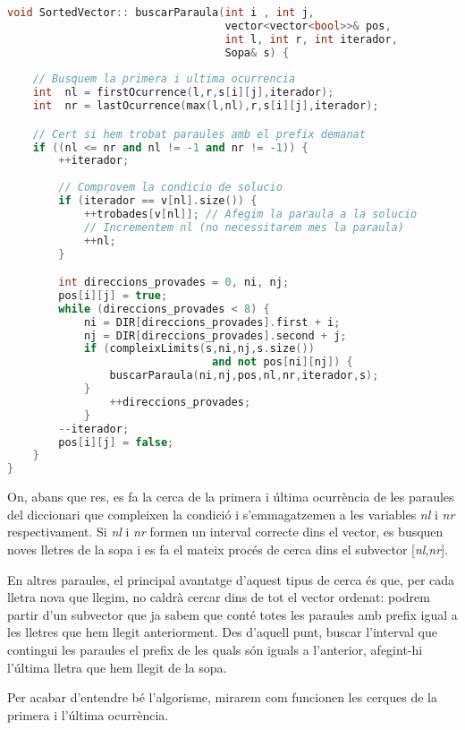 \documentclass[titlepage]{article}
\begin{document}
\begin{lstlisting}[language=C++]
void SortedVector:: buscarParaula(int i , int j, 
                                  vector<vector<bool>>& pos,
                                  int l, int r, int iterador,
                                  Sopa& s) {
    
    // Busquem la primera i ultima ocurrencia
    int  nl = firstOcurrence(l,r,s[i][j],iterador);
    int  nr = lastOcurrence(max(l,nl),r,s[i][j],iterador);

    // Cert si hem trobat paraules amb el prefix demanat
    if ((nl <= nr and nl != -1 and nr != -1)) {
        ++iterador;
        
        // Comprovem la condicio de solucio
        if (iterador == v[nl].size()) { 
            ++trobades[v[nl]]; // Afegim la paraula a la solucio
            // Incrementem nl (no necessitarem mes la paraula)
            ++nl; 
        }

        int direccions_provades = 0, ni, nj;
        pos[i][j] = true;
        while (direccions_provades < 8) {
            ni = DIR[direccions_provades].first + i;
            nj = DIR[direccions_provades].second + j; 
            if (compleixLimits(s,ni,nj,s.size()) 
                                and not pos[ni][nj]) {
                buscarParaula(ni,nj,pos,nl,nr,iterador,s);
            }
                ++direccions_provades;
            }
        --iterador;
        pos[i][j] = false;
    }
}    
\end{lstlisting}


On, abans que res, es fa la cerca de la primera i última ocurrència de les paraules del diccionari que compleixen la condició i s'emmagatzemen a les variables \textit{nl} i \textit{nr} respectivament. Si \textit{nl} i \textit{nr} formen un interval correcte dins el vector, es busquen noves lletres de la sopa i es fa el mateix procés de cerca dins el subvector [\textit{nl},\textit{nr}].\newline\par 
En altres paraules, el principal avantatge d'aquest tipus de cerca és que, per cada lletra nova que llegim, no caldrà cercar dins de tot el vector ordenat: podrem partir d'un subvector que ja sabem que conté totes les paraules amb prefix igual a les lletres que hem llegit anteriorment. Des d'aquell punt, buscar l'interval que contingui les paraules el prefix de les quals són iguals a l'anterior, afegint-hi l'última lletra que hem llegit de la sopa.\newline\par
Per acabar d'entendre bé l'algorisme, mirarem com funcionen les cerques de la primera i l'última ocurrència.
\end{document}
